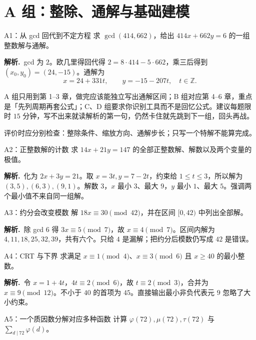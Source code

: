 \documentclass[UTF8,a4paper,11pt,oneside,openany,fontset=fandol]{ctexbook}
\theoremstyle{definition}
\newcommand{\Z}{\mathbb Z}
\newcommand{\sol}{\par\noindent\textbf{解析.}\ }
\begin{document}
\section{A 组：整除、通解与基础建模}
\begin{problem}{A1：从 gcd 回代到不定方程}
求 $\gcd(414,662)$，给出 $414x+662y=6$ 的一组整数解与通解。
\end{problem}

\sol gcd 为 $2$。欧几里得回代得 $2=8\cdot414-5\cdot662$，乘三后得到 $(x_0,y_0)=(24,-15)$。通解为
\[
 x=24+331t,\qquad y=-15-207t,\quad t\in\Z.
\]

\begin{tip}[三档练习的用法]
A 组只用到第 1--3 章，做完应该能独立写出通解区间；B 组对应第 4--6 章，重点是「先列周期再套公式」；C、D 组要求你识别工具而不是回忆公式。建议每题限时 $15$ 分钟，写不出来就读解析的第一句，仍然卡住就先跳到下一组，回头再战。
\end{tip}

评价时应分别检查：整除条件、缩放方向、通解步长；只写一个特解不能算完成。


\begin{problem}{A2：正整数解的计数}
求 $14x+21y=147$ 的全部正整数解、解数以及两个变量的极值。
\end{problem}

\sol 化为 $2x+3y=21$。取 $x=3t,y=7-2t$，约束给 $1\le t\le3$，所以解为 $(3,5),(6,3),(9,1)$。解数 $3$，$x$ 最小 $3$、最大 $9$，$y$ 最小 $1$、最大 $5$。强调两个最小值不来自同一组解。


\begin{problem}{A3：约分会改变模数}
解 $18x\equiv30\pmod{42}$，并在区间 $[0,42)$ 中列出全部解。
\end{problem}

\sol 除 gcd $6$ 得 $3x\equiv5\pmod7$，故 $x\equiv4\pmod7$。区间内解为 $4,11,18,25,32,39$，共有六个。只给 $4$ 是漏解；把约分后模数仍写成 $42$ 是错误。


\begin{problem}{A4：CRT 与下界}
求满足 $x\equiv1\pmod4$、$x\equiv3\pmod6$ 且 $x\ge40$ 的最小整数。
\end{problem}

\sol 令 $x=1+4t$，$4t\equiv2\pmod6$，故 $t\equiv2\pmod3$，合并为 $x\equiv9\pmod{12}$。不小于 $40$ 的首项为 $45$。直接输出最小非负代表元 $9$ 忽略了大小约束。


\begin{problem}{A5：一个质因数分解对应多种函数}
计算 $\varphi(72),\mu(72),\tau(72)$ 与 $\sum_{d\mid72}\varphi(d)$。
\end{problem}
\end{document}
